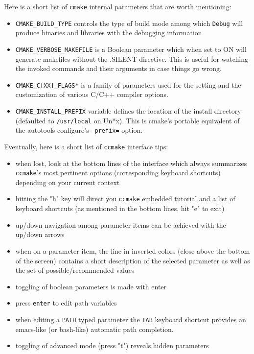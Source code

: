 \noindent
Here is a short list of \verb+cmake+ internal parameters that are worth
mentioning:
\begin{itemize}
\item
  \verb+CMAKE_BUILD_TYPE+ controls the type of build mode among which
  \verb+Debug+ will produce binaries and libraries with the debugging
  information
\item
   \verb+CMAKE_VERBOSE_MAKEFILE+ is a Boolean parameter which when set to ON
   will generate makefiles without the .SILENT directive. This is useful for
   watching the invoked commands and their arguments in case things go wrong.
\item
   \verb+CMAKE_C[XX]_FLAGS*+ is a family of parameters used for the
   setting and the customization of various C/C++ compiler options.
\item
   \verb+CMAKE_INSTALL_PREFIX+ variable defines the location of the install
   directory (defaulted to \verb+/usr/local+ on Un*x).  This is cmake's
   portable equivalent of the autotools configure's \texttt{--prefix=} option.
\end{itemize}
%
Eventually, here is a short list of \verb+ccmake+ interface tips:
\begin{itemize}
\item
  when lost, look at the bottom lines of the interface which always summarizes
  \verb+ccmake+'s most pertinent options (corresponding keyboard shortcuts)
  depending on your current context
\item
  hitting the "h" key will direct you \verb+ccmake+ embedded tutorial and a
  list of keyboard shortcuts (as mentioned in the bottom lines, hit "e" to
  exit)
\item
  up/down navigation among parameter items can be achieved with the up/down
  arrows
\item
  when on a parameter item, the line in inverted colors (close above the bottom
  of the screen) contains a short description of the selected parameter as well
  as the set of possible/recommended values
\item
  toggling of boolean parameters is made with enter
\item
  press \verb+enter+ to edit path variables
\item
  when editing a \verb+PATH+ typed parameter the \verb+TAB+ keyboard shortcut
  provides an emacs-like (or bash-like) automatic path completion.
\item
  toggling of advanced mode (press "t") reveals hidden parameters
\end{itemize}
 
